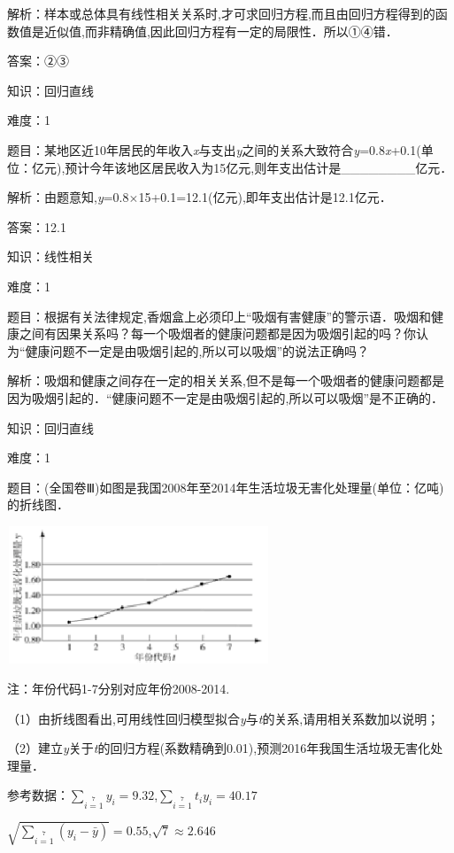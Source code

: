 \documentclass{article} %
\begin{document}
解析：样本或总体具有线性相关关系时,才可求回归方程,而且由回归方程得到的函数值是近似值,而非精确值,因此回归方程有一定的局限性．所以①④错．

答案：②③

知识：回归直线

难度：1

题目：某地区近10年居民的年收入\textit{x}与支出\textit{y}之间的关系大致符合\textit{y}=0.8\textit{x}+0.1(单位：亿元),预计今年该地区居民收入为15亿元,则年支出估计是\_\_\_\_\_\_\_\_亿元．

解析：由题意知,\textit{y}=0.8$\mathrm{\times}$15+0.1=12.1(亿元),即年支出估计是12.1亿元．

答案：12.1

知识：线性相关

难度：1

题目：根据有关法律规定,香烟盒上必须印上``吸烟有害健康''的警示语．吸烟和健康之间有因果关系吗？每一个吸烟者的健康问题都是因为吸烟引起的吗？你认为``健康问题不一定是由吸烟引起的,所以可以吸烟''的说法正确吗？

解析：吸烟和健康之间存在一定的相关关系,但不是每一个吸烟者的健康问题都是因为吸烟引起的．``健康问题不一定是由吸烟引起的,所以可以吸烟''是不正确的．



知识：回归直线

难度：1

题目：(全国卷Ⅲ)如图是我国2008年至2014年生活垃圾无害化处理量(单位：亿吨)的折线图．

\includegraphics*[width=3.10in, height=1.62in, keepaspectratio=false]{image98}

注：年份代码1-7分别对应年份2008-2014.

（1）由折线图看出,可用线性回归模型拟合\textit{y}与\textit{t}的关系,请用相关系数加以说明；

（2）建立\textit{y}关于\textit{t}的回归方程(系数精确到0.01),预测2016年我国生活垃圾无害化处理量．

参考数据：$\sum\limits_{i=1}\limits^{7}y_i=9.32$,$\sum\limits_{i=1}\limits^{7}t_iy_i=40.17$

$\sqrt{\sum\limits_{i=1}\limits^{7}(y_i-\bar{y})}=0.55$,$\sqrt{7}\approx2.646$
\end{document}
